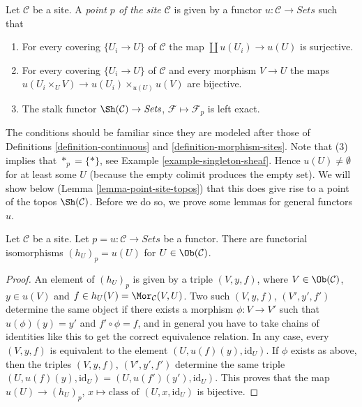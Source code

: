 \begin{definition}
\label{definition-point}
Let $\mathcal{C}$ be a site. A {\it point $p$ of the site
$\mathcal{C}$} is given by a functor $u : \mathcal{C}
\to \textit{Sets}$ such that
\begin{enumerate}
\item For every covering $\{U_i \to U\}$ of $\mathcal{C}$ the map
$\coprod u(U_i) \to u(U)$ is surjective.
\item For every covering $\{U_i \to U\}$ of $\mathcal{C}$ and
every morphism $V \to U$ the maps
$u(U_i \times_U V) \to u(U_i) \times_{u(U)} u(V)$ are bijective.
\item The stalk functor $\Sh(\mathcal{C}) \to \textit{Sets}$,
$\mathcal{F} \mapsto \mathcal{F}_p$ is left exact.
\end{enumerate}
\end{definition}

\noindent
The conditions should be familiar since they are modeled after those of
Definitions \ref{definition-continuous} and
\ref{definition-morphism-sites}.
Note that (3) implies that $*_p = \{*\}$, see
Example \ref{example-singleton-sheaf}. Hence $u(U) \not= \emptyset$
for at least some $U$ (because the empty colimit produces the
empty set). We will show below (Lemma \ref{lemma-point-site-topos})
that this does give rise
to a point of the topos $\Sh(\mathcal{C})$.
Before we do so, we prove some lemmas for general functors $u$.

\begin{lemma}
\label{lemma-points-recover}
Let $\mathcal{C}$ be a site.
Let $p = u : \mathcal{C} \to \textit{Sets}$ be a functor.
There are functorial isomorphisms
$(h_U)_p = u(U)$ for $U \in \Ob(\mathcal{C})$.
\end{lemma}

\begin{proof}
An element of $(h_U)_p$ is given by a triple $(V, y, f)$,
where $V \in \Ob(\mathcal{C})$, $y\in u(V)$ and
$f \in h_U(V) = \Mor_\mathcal{C}(V, U)$.
Two such $(V, y, f)$, $(V', y', f')$ determine the same object if
there exists a morphism $\phi : V \to V'$ such that
$u(\phi)(y) = y'$ and $f' \circ \phi = f$, and in general you have
to take chains of identities like this to get the correct equivalence
relation. In any case, every $(V, y, f)$ is equivalent to
the element $(U, u(f)(y), \text{id}_U)$. If $\phi$ exists as above,
then the triples $(V, y, f)$, $(V', y', f')$ determine the same triple
$(U, u(f)(y), \text{id}_U) = (U, u(f')(y'), \text{id}_U)$.
This proves that the map
$u(U) \to (h_U)_p$, $x \mapsto \text{class of }(U, x, \text{id}_U)$
is bijective.
\end{proof}

